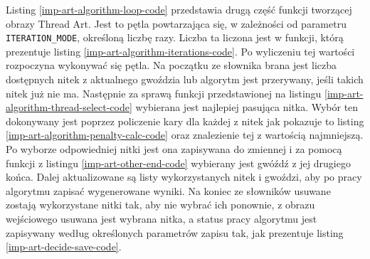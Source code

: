         Listing \ref{imp-art-algorithm-loop-code} przedstawia drugą część funkcji tworzącej obrazy Thread Art. Jest to pętla powtarzająca się, w zależności od parametru \texttt{ITERATION_MODE}, określoną liczbę razy. Liczba ta liczona jest w funkcji, którą prezentuje listing \ref{imp-art-algorithm-iterations-code}. Po wyliczeniu tej wartości rozpoczyna wykonywać się pętla. Na początku ze słownika brana jest liczba dostępnych nitek z aktualnego gwoździa lub algorytm jest przerywany, jeśli takich nitek już nie ma. Następnie za sprawą funkcji przedstawionej na listingu \ref{imp-art-algorithm-thread-select-code} wybierana jest najlepiej pasująca nitka. Wybór ten dokonywany jest poprzez policzenie kary dla każdej z nitek jak pokazuje to listing \ref{imp-art-algorithm-penalty-calc-code} oraz znalezienie tej z wartością najmniejszą. Po wyborze odpowiedniej nitki jest ona zapisywana do zmiennej i za pomocą funkcji z listingu \ref{imp-art-other-end-code} wybierany jest gwóźdź z jej drugiego końca. Dalej aktualizowane są listy wykorzystanych nitek i gwoździ, aby po pracy algorytmu zapisać wygenerowane wyniki. Na koniec ze słowników usuwane zostają wykorzystane nitki tak, aby nie wybrać ich ponownie, z obrazu wejściowego usuwana jest wybrana nitka, a status pracy algorytmu jest zapisywany według określonych parametrów zapisu tak, jak prezentuje listing \ref{imp-art-decide-save-code}.
        \newpage
        
